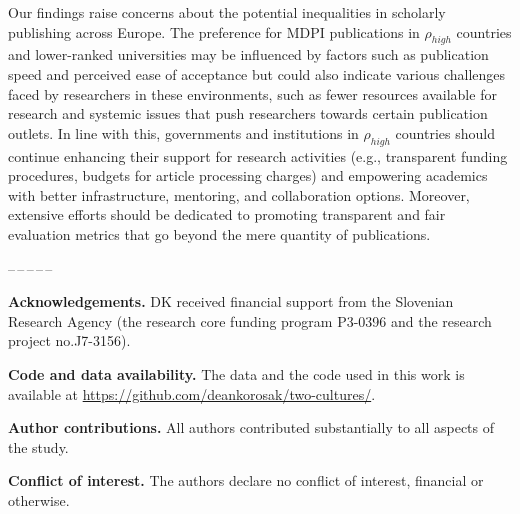 \documentclass[amsfonts, amssymb, prl, superscriptaddress, notitlepage, twocolumn, nofootinbib]{revtex4-2}
\begin{document}
Our findings raise concerns about the potential inequalities in scholarly publishing across Europe. The preference for MDPI publications in $\rho_{high}$ countries and lower-ranked universities may be influenced by factors such as publication speed and perceived ease of acceptance but could also indicate various challenges faced by researchers in these environments, such as fewer resources available for research and systemic issues that push researchers towards certain publication outlets. In line with this, governments and institutions in $\rho_{high}$ countries should continue enhancing their support for research activities (e.g., transparent funding procedures, budgets for article processing charges) and empowering academics with better infrastructure, mentoring, and collaboration options. Moreover, extensive efforts should be dedicated to promoting transparent and fair evaluation metrics that go beyond the mere quantity of publications. 

  
\begin{center}
--\,--\,--\,--\,--
\end{center}
\vspace{1mm}
\noindent\textbf{Acknowledgements.} DK received financial support from the Slovenian Research Agency (the research core funding program P3-0396 and the research project no.J7-3156). 

\noindent\textbf{Code and data availability.} The data and the code used in this work is available at \url{https://github.com/deankorosak/two-cultures/}.

\noindent\textbf{Author contributions.} All authors contributed substantially to all aspects of the study.

\noindent\textbf{Conflict of interest.} The authors declare no conflict of interest, financial or otherwise.
 

{}

\end{document}
